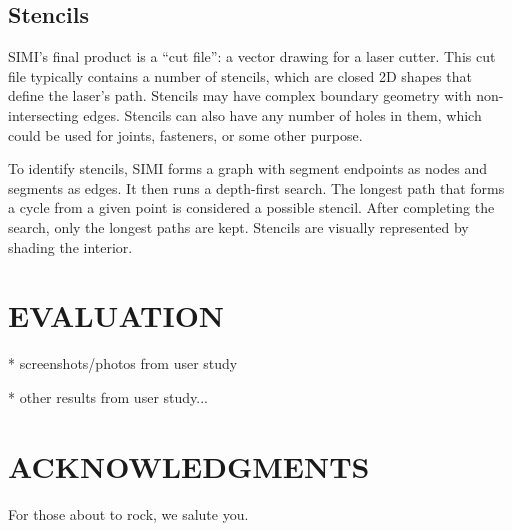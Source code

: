 \documentclass{article}
\begin{document}
\subsection{Stencils}

SIMI's final product is a ``cut file'': a vector drawing for a laser
cutter. This cut file typically contains a number of stencils, which
are closed 2D shapes that define the laser's path. Stencils may have
complex boundary geometry with non-intersecting edges. Stencils can
also have any number of holes in them, which could be used for joints,
fasteners, or some other purpose.

To identify stencils, SIMI forms a graph with segment endpoints as
nodes and segments as edges. It then runs a depth-first search. The
longest path that forms a cycle from a given point is considered a
possible stencil. After completing the search, only the longest paths
are kept. Stencils are visually represented by shading the
interior. 

\section{EVALUATION}

* screenshots/photos from user study

* other results from user study...

\section{ACKNOWLEDGMENTS}

For those about to rock, we salute you.



\end{document}
